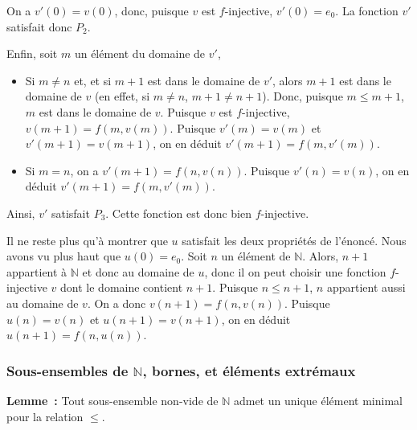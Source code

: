 On a $v'(0) = v(0)$, donc, puisque $v$ est $f$-injective, $v'(0) = e_0$. 
La fonction $v'$ satisfait donc $P_2$. 

Enfin, soit $m$ un élément du domaine de $v'$, 
\begin{itemize}[nosep]
    \item Si $m \neq n$ et, et si $m+1$ est dans le domaine de $v'$, alors $m+1$ est dans le domaine de $v$ (en effet, si $m \neq n$, $m+1 \neq n+1$). 
        Donc, puisque $m \leq m+1$, $m$ est dans le domaine de $v$. 
        Puisque $v$ est $f$-injective, $v(m+1) = f(m, v(m))$. 
        Puisque $v'(m) = v(m)$ et $v'(m+1) = v(m+1)$, on en déduit $v'(m+1) = f(m, v'(m))$.
    \item Si $m = n$, on a $v'(m+1) = f(n, v(n))$. Puisque $v'(n) = v(n)$, on en déduit $v'(m+1) = f(m,v'(m))$.
\end{itemize}
Ainsi, $v'$ satisfait $P_3$. 
Cette fonction est donc bien $f$-injective.

Il ne reste plus qu'à montrer que $u$ satisfait les deux propriétés de l'énoncé. 
Nous avons vu plus haut que $u(0) = e_0$. 
Soit $n$ un élément de $\mathbb{N}$. 
Alors, $n+1$ appartient à $\mathbb{N}$ et donc au domaine de $u$, donc il on peut choisir une fonction $f$-injective $v$ dont le domaine contient $n+1$. 
Puisque $n \leq n+1$, $n$ appartient aussi au domaine de $v$. 
On a donc $v(n+1) = f(n, v(n))$. 
Puisque $u(n) = v(n)$ et $u(n+1) = v(n+1)$, on en déduit $u(n+1) = f(n, u(n))$.

\done

\subsubsection{Sous-ensembles de \texorpdfstring{$\mathbb{N}$}{N}, bornes, et éléments extrémaux}

\noindent\textbf{Lemme :} Tout sous-ensemble non-vide de $\mathbb{N}$ admet un unique élément minimal pour la relation $\leq$.

\medskip

